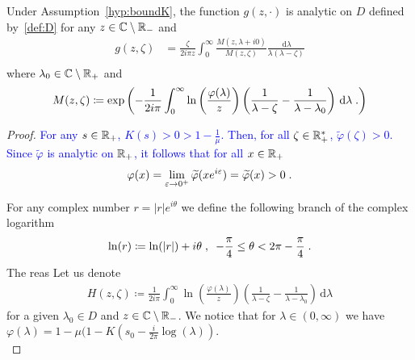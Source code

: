 \documentclass[11pt]{amsart}
\newcommand{\f}{\frac}
\newcommand{\blue}[1]{\textcolor{blue}{#1}}
\newcommand{\diff}{\,\mathrm{d}}
\begin{document}
\begin{proposition}
\label{p:explicit_g}
Under Assumption~\ref{hyp:boundK}, the function $g(z, \cdot)$ is analytic on $D$ defined by~\eqref{def:D} for any $z \in \mathbb{C} \setminus \mathbb{R}_-$ and
\begin{align*}
    g(z,\zeta) 
    &= 
    \frac{\zeta}{2i\pi z}\int_0^\infty  \frac{M(z,\lambda+i0)}{M(z,\zeta)} \frac{\diff \lambda}{\lambda(\lambda-\zeta)} \\
\end{align*}
where $\lambda_0 \in \mathbb{C} \setminus \mathbb{R}_+$ and 
$$ M(z, \zeta) \coloneqq \exp\left(-{\frac{1}{2i\pi  }\int_0^\infty \ln\left(\frac{\varphi(\lambda)}{z}\right) \left( \frac{1}{\lambda-\zeta} - \frac{1}{\lambda-\lambda_0}\right) \diff \lambda} \eqfinp\right)$$ 
\end{proposition}
\begin{proof}
\blue{For any $s \in \mathbb{R}_+$, $K(s) > 0 > 1 - \frac1\mu$. Then, 
for all $\zeta \in \mathbb{R}_+^*$, $\tilde \varphi(\zeta) > 0$.
Since $\tilde \varphi$ is analytic on $\mathbb{R}_+$, it follows that for all $x \in \mathbb{R}_+$ 
    $$\varphi(x) = \lim_{\varepsilon \to 0^+} \widetilde \varphi(xe^{i\varepsilon}) = \widetilde \varphi(x) > 0 \; .$$
}

For any complex number $r = |r|e^{i\theta}$ we define the following branch of the complex logarithm
\begin{equation}\label{def:log}
\ln(r) \coloneqq \ln(|r|) + i\theta \; , \enspace -\frac{\pi}{4} \leq \theta < 2\pi - \frac{\pi}{4}  \; .
\end{equation}
The reas
Let us denote
    \begin{align}\label{def:H}
        H(z,\zeta) \coloneqq \frac{1}{2i\pi }\int_0^\infty \ln\left(\frac{\varphi(\lambda)}{z}\right) \left( \frac{1}{\lambda-\zeta} - \frac{1}{\lambda-\lambda_0}\right) \diff \lambda
    \end{align}
for a given $\lambda_0 \in D$ and \blue{$z \in \mathbb{C} \setminus \mathbb{R}_-$}. We notice that for $\lambda \in (0,\infty)$ we have $\varphi(\lambda)=1-\mu(1-K(s_0-\f{i}{2\pi} \log(\lambda))$.\\


\end{proof}
\end{document}
